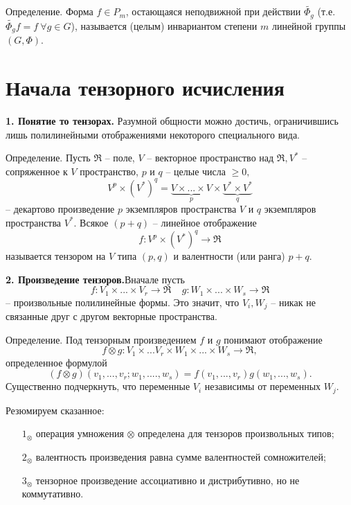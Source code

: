 \documentclass[a4paper, 12pt]{article} %
\begin{document}
Определение. Форма $f \in P_m$, остающаяся неподвижной при действии $\widetilde{\Phi_g}$ (т.е. $\widetilde{\Phi_g}f = f \ \forall g \in G$), называется (целым) инвариантом степени $m$ линейной группы $(G, \Phi)$.

\clearpage
\section*{Начала тензорного исчисления}
\textbf{1. Понятие то тензорах.} Разумной общности можно достичь, ограничившись лишь полилинейными отображениями некоторого специального вида.

Определение. Пусть $\Re$ -- поле, $V$ -- векторное пространство над $\Re, V^*$ -- сопряженное к $V$ пространство, $p$ и $q$ -- целые числа $\geq 0,$
\begin{equation}
    V^p \times (V^*)^q = \underbrace{V \times ... \times V}_{p} \times \underbrace{V^* \times V^*}_{q}
\end{equation}
-- декартово произведение $p$ экземпляров пространства $V$ и $q$ экземпляров пространства $V^*$. Всякое $(p + q)$ -- линейное отображение
\begin{equation}
    f: V^p \times (V^*)^q \to \Re
\end{equation}
называется тензором на $V$ типа $(p, q)$ и валентности (или ранга) $p + q$.

\textbf{2. Произведение тензоров.}Вначале пусть
\begin{equation}
    f: V_1 \times ... \times V_r \to \Re ~~~~~ g: W_1 \times ... \times W_s \to \Re
\end{equation}
-- произвольные полилинейные формы. Это значит, что $V_i, W_j$ -- никак не связанные друг с другом векторные пространства.

Определение. Под тензорным произведением $f$ и $g$ понимают отображение
\begin{equation}
    f \otimes g: V_1 \times ... V_r \times W_1 \times ... \times W_s \to \Re,
\end{equation}
определенное формулой
\begin{equation}
    (f \otimes g)(v_1, ..., v_r; w_1, ...., w_s) = f(v_1, ..., v_r)g(w_1, ..., w_s).
\end{equation}
Существенно подчеркнуть, что переменные $V_i$ независимы от переменных $W_j$.

Резюмируем сказанное:
\begin{enumerate}
    \item [$1_\otimes$] операция умножения $\otimes$ определена для тензоров произвольных типов;
    \item [$2_\otimes$] валентность произведения равна сумме валентностей сомножителей;
    \item [$3_\otimes$] тензорное произведение ассоциативно и дистрибутивно, но не коммутативно.
\end{enumerate}
\end{document}
